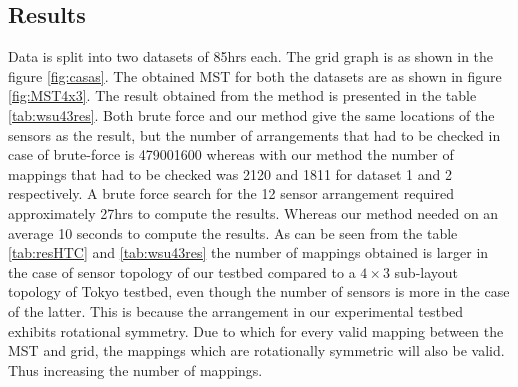 \subsection{Results}
Data is split into two datasets of 85hrs each. The grid graph is as shown in the figure \ref{fig:casas}. The obtained MST for both the datasets are as shown in figure \ref{fig:MST4x3}. The result obtained from the method is presented in the table \ref{tab:wsu43res}. Both brute force and our method give the same locations of the sensors as the result, but the number of arrangements that had to be checked in case of brute-force is 479001600 whereas with our method the number of mappings that had to be checked was 2120 and 1811 for dataset 1 and 2 respectively. A brute force search for the 12 sensor arrangement required approximately 27hrs to compute the results. Whereas our method needed on an average 10 seconds to compute the results. As can be seen from the table \ref{tab:resHTC} and \ref{tab:wsu43res} the number of mappings obtained is larger in the case of sensor topology of our testbed compared to a $4 \times 3$ sub-layout topology of Tokyo testbed, even though the number of sensors is more in the case of the latter. This is because the arrangement in our experimental testbed exhibits rotational symmetry. Due to which for every valid mapping between the MST and grid, the mappings which are rotationally symmetric will also be valid. Thus increasing the number of mappings.
